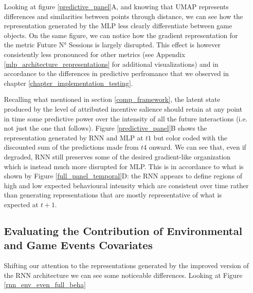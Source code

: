 Looking at figure \ref{predictive_panel}A, and knowing that UMAP represents differences and similarities between points through distance, we can see how the representation generated by the MLP less clearly differentiate between game objects. On the same figure, we can notice how the gradient representation for the metric Future N° Sessions is largely disrupted. This effect is however consistently less pronounced for other metrics (see Appendix \ref{mlp_architecture_representations} for additional visualizations) and in accordance to the differences in predictive perfromance that we observed in chapter \ref{chapter_implementation_testing}. 

Recalling what mentioned in section \ref{comp_framework}, the latent state produced by the level of attributed incentive salience should retain at any point in time some predictive power over the intensity of all the future interactions (i.e. not just the one that follows). Figure \ref{predictive_panel}B shows the representation generated by RNN and MLP at $t1$ but color coded with the discounted sum of the predictions made from $t4$ onward. We can see that, even if degraded, RNN still preserves some of the desired gradient-like organization which is instead much more disrupted for MLP. This is in accordance to what is shown by Figure \ref{full_panel_temporal}D: the RNN appears to define regions of high and low expected behavioural intensity which are consistent over time rather than generating representations that are mostly representative of what is expected at $t+1$.

\subsection{Evaluating the Contribution of Environmental and Game Events Covariates}
\label{representation_env_even}
Shifting our attention to the representations generated by the improved version of the RNN architecture we can see some noticeable differences. Looking at Figure \ref{rnn_env_even_full_beha} 

